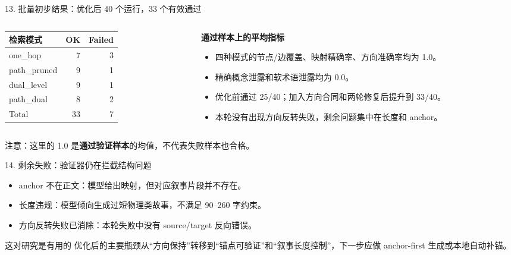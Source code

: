 \documentclass[aspectratio=169,UTF8]{ctexbeamer}
\newcommand{\badcase}[1]{\textcolor{FableOrange}{#1}}
\begin{document}
\begin{frame}{13. 批量初步结果：优化后 40 个运行，33 个有效通过}
  \small
  \begin{columns}[T,onlytextwidth]
    \begin{column}{0.45\textwidth}
      \begin{tabular}{lrr}
        \toprule
        检索模式 & OK & Failed \\
        \midrule
        one\_hop & 7 & 3 \\
        path\_pruned & 9 & 1 \\
        dual\_level & 9 & 1 \\
        path\_dual & 8 & 2 \\
        \midrule
        Total & 33 & 7 \\
        \bottomrule
      \end{tabular}
    \end{column}
    \begin{column}{0.52\textwidth}
      \textbf{通过样本上的平均指标}
      \begin{itemize}
        \item 四种模式的节点/边覆盖、映射精确率、方向准确率均为 1.0。
        \item 精确概念泄露和软术语泄露均为 0.0。
        \item 优化前通过 25/40；加入方向合同和两轮修复后提升到 33/40。
        \item 本轮没有出现方向反转失败，剩余问题集中在长度和 anchor。
      \end{itemize}
    \end{column}
  \end{columns}

  \vspace{0.5em}
  注意：这里的 1.0 是\textbf{通过验证样本}的均值，不代表失败样本也合格。
\end{frame}

\begin{frame}{14. 剩余失败：验证器仍在拦截结构问题}
  \begin{itemize}
    \item \badcase{anchor 不在正文}：模型给出映射，但对应叙事片段并不存在。
    \item \badcase{长度违规}：模型倾向生成过短物理类故事，不满足 90--260 字约束。
    \item \textcolor{FableGreen}{方向反转失败已消除}：本轮失败中没有 source/target 反向错误。
  \end{itemize}

  \vspace{0.8em}
  \begin{block}{这对研究是有用的}
    优化后的主要瓶颈从“方向保持”转移到“锚点可验证”和“叙事长度控制”，下一步应做 anchor-first 生成或本地自动补锚。
  \end{block}
\end{frame}
\end{document}
